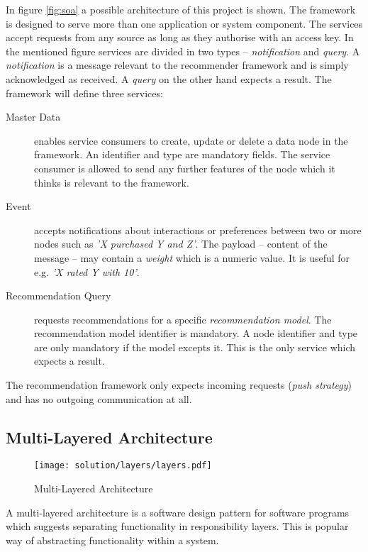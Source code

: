 In figure \ref{fig:soa} a possible architecture of this project is shown. The framework is designed to serve more than one application or system component. The services accept requests from any source as long as they authorise with an access key. In the mentioned figure services are divided in two types -- \emph{notification} and \emph{query}. A \emph{notification} is a message relevant to the recommender framework and is simply acknowledged as received. A \emph{query} on the other hand expects a result. The framework will define three services:

\begin{description}
    \item[Master Data] enables service consumers to create, update or delete a data node in the framework. An identifier and type are mandatory fields. The service consumer is allowed to send any further features of the node which it thinks is relevant to the framework.
    \item[Event] accepts notifications about interactions or preferences between two or more nodes such as \emph{'X purchased Y and Z'}. The payload -- content of the message -- may contain a \emph{weight} which is a numeric value. It is useful for e.g. \emph{'X rated Y with 10'}.
    \item[Recommendation Query] requests recommendations for a specific \emph{recommendation model}. The recommendation model identifier is mandatory. A node identifier and type are only mandatory if the model excepts it. This is the only service which expects a result.
\end{description}

The recommendation framework only expects incoming requests (\emph{push strategy}) and has no outgoing communication at all.

\subsection{Multi-Layered Architecture}
\label{sol-design-layer}

\begin{figure}[ht]
    \texttt{[image: solution/layers/layers.pdf]}
    \caption{Multi-Layered Architecture}
    \label{fig:layers}
\end{figure}

A multi-layered architecture is a software design pattern for software programs which suggests separating functionality in responsibility layers. This is popular way of abstracting functionality within a system.


